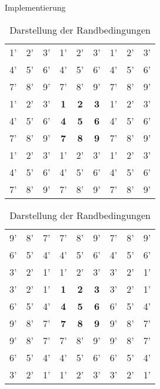 \documentclass[runningheads]{llncs}
\begin{document}
\begin{section}{Implementierung}
            \begin{table}
                \centering
                \caption{Darstellung der Randbedingungen}
                \label{randbedingungen}
                \begin{tabular}{ | c c c | c c c | c c c | }
                    \hline
                    1' & 2' & 3' & 1' & 2' & 3' & 1' & 2' & 3' \\
                    4' & 5' & 6' & 4' & 5' & 6' & 4' & 5' & 6' \\
                    7' & 8' & 9' & 7' & 8' & 9' & 7' & 8' & 9' \\
                    \hline
                    1' & 2' & 3' & \textbf{1}  & \textbf{2}  & \textbf{3}  & 1' & 2' & 3' \\
                    4' & 5' & 6' & \textbf{4}  & \textbf{5}  & \textbf{6}  & 4' & 5' & 6' \\
                    7' & 8' & 9' & \textbf{7}  & \textbf{8}  & \textbf{9}  & 7' & 8' & 9' \\
                    \hline
                    1' & 2' & 3' & 1' & 2' & 3' & 1' & 2' & 3' \\
                    4' & 5' & 6' & 4' & 5' & 6' & 4' & 5' & 6' \\
                    7' & 8' & 9' & 7' & 8' & 9' & 7' & 8' & 9' \\
                    \hline
                \end{tabular}
                \begin{tabular}{ | c c c | c c c | c c c | }
                    \hline
                    9' & 8' & 7' & 7' & 8' & 9' & 7' & 8' & 9' \\
                    6' & 5' & 4' & 4' & 5' & 6' & 4' & 5' & 6' \\
                    3' & 2' & 1' & 1' & 2' & 3' & 3' & 2' & 1' \\
                    \hline
                    3' & 2' & 1' & \textbf{1}  & \textbf{2}  & \textbf{3}  & 3' & 2' & 1' \\
                    6' & 5' & 4' & \textbf{4}  & \textbf{5}  & \textbf{6}  & 6' & 5' & 4' \\
                    9' & 8' & 7' & \textbf{7}  & \textbf{8}  & \textbf{9}  & 9' & 8' & 7' \\
                    \hline
                    9' & 8' & 7' & 7' & 8' & 9' & 9' & 8' & 7' \\
                    6' & 5' & 4' & 4' & 5' & 6' & 6' & 5' & 4' \\
                    3' & 2' & 1' & 1' & 2' & 3' & 3' & 2' & 1' \\
                    \hline
                \end{tabular}
            \end{table}
	

\end{section}
\end{document}
